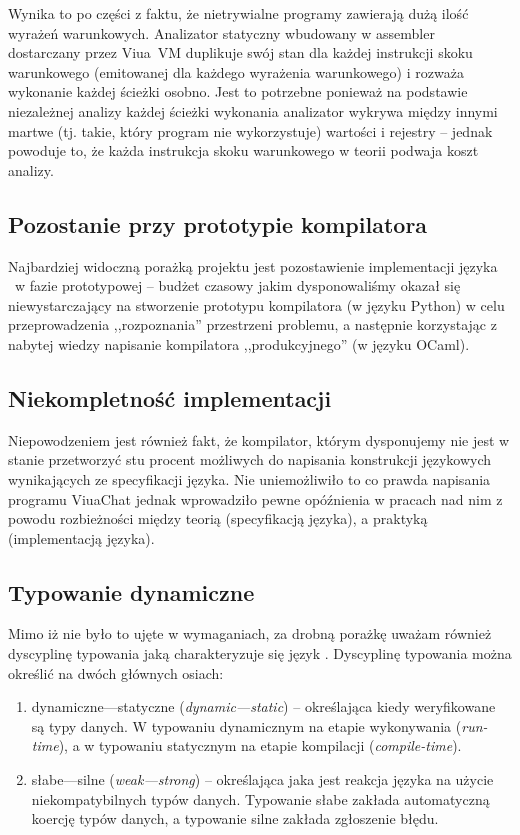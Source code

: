 Wynika to po części z faktu, że nietrywialne programy zawierają dużą ilość
wyrażeń warunkowych. Analizator statyczny wbudowany w assembler dostarczany
przez Viua~VM duplikuje swój stan dla każdej instrukcji skoku warunkowego
(emitowanej dla każdego wyrażenia warunkowego) i rozważa wykonanie każdej
ścieżki osobno.
Jest to potrzebne ponieważ na podstawie niezależnej analizy każdej ścieżki
wykonania analizator wykrywa między innymi martwe (tj. takie, który program nie
wykorzystuje) wartości i rejestry -- jednak powoduje to, że każda instrukcja
skoku warunkowego w teorii podwaja koszt analizy.

\subsection{Pozostanie przy prototypie kompilatora}

Najbardziej widoczną porażką projektu jest pozostawienie implementacji języka
\ViuAct\ w fazie prototypowej -- budżet czasowy jakim dysponowaliśmy okazał się
niewystarczający na stworzenie prototypu kompilatora (w języku Python) w celu
przeprowadzenia ,,rozpoznania'' przestrzeni problemu, a następnie korzystając z
nabytej wiedzy napisanie kompilatora ,,produkcyjnego'' (w języku OCaml).

\subsection{Niekompletność implementacji}

Niepowodzeniem jest również fakt, że kompilator, którym dysponujemy nie jest w
stanie przetworzyć stu procent możliwych do napisania konstrukcji językowych
wynikających ze specyfikacji języka. Nie uniemożliwiło to co prawda napisania
programu ViuaChat jednak wprowadziło pewne opóźnienia w pracach nad nim z powodu
rozbieżności między teorią (specyfikacją języka), a praktyką (implementacją
języka).

\subsection{Typowanie dynamiczne}

Mimo iż nie było to ujęte w wymaganiach, za drobną porażkę uważam również
dyscyplinę typowania jaką charakteryzuje się język \ViuAct. Dyscyplinę typowania
można określić na dwóch głównych osiach:
\begin{enumerate}
\item dynamiczne---statyczne (\emph{dynamic---static}) -- określająca kiedy
    weryfikowane są typy danych. W typowaniu dynamicznym na etapie wykonywania
    (\emph{run-time}), a w typowaniu statycznym na etapie kompilacji
    (\emph{compile-time}).
\item słabe---silne (\emph{weak---strong}) -- określająca jaka jest reakcja
    języka na użycie niekompatybilnych typów danych. Typowanie słabe zakłada
    automatyczną koercję typów danych, a typowanie silne zakłada zgłoszenie
    błędu.
\end{enumerate}

